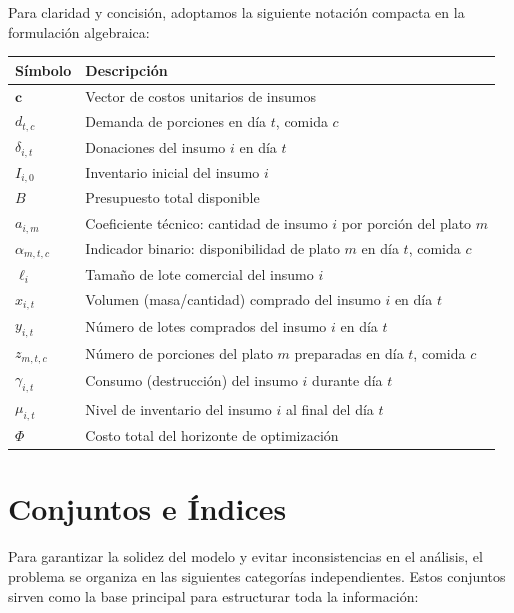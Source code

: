 \documentclass[12pt]{report}
\begin{document}
Para claridad y concisión, adoptamos la siguiente notación compacta en la formulación algebraica:

\begin{table}[h]
\centering
\small
\begin{tabular}{ll}
\toprule
\textbf{Símbolo} & \textbf{Descripción} \\
\midrule
$\mathbf{c}$ & Vector de costos unitarios de insumos \\
$d_{t,c}$ & Demanda de porciones en día $t$, comida $c$ \\
$\delta_{i,t}$ & Donaciones del insumo $i$ en día $t$ \\
$I_{i,0}$ & Inventario inicial del insumo $i$ \\
$B$ & Presupuesto total disponible \\
$a_{i,m}$ & Coeficiente técnico: cantidad de insumo $i$ por porción del plato $m$ \\
$\alpha_{m,t,c}$ & Indicador binario: disponibilidad de plato $m$ en día $t$, comida $c$ \\
$\ell_i$ & Tamaño de lote comercial del insumo $i$ \\
\midrule
$x_{i,t}$ & Volumen (masa/cantidad) comprado del insumo $i$ en día $t$ \\
$y_{i,t}$ & Número de lotes comprados del insumo $i$ en día $t$ \\
$z_{m,t,c}$ & Número de porciones del plato $m$ preparadas en día $t$, comida $c$ \\
$\gamma_{i,t}$ & Consumo (destrucción) del insumo $i$ durante día $t$ \\
$\mu_{i,t}$ & Nivel de inventario del insumo $i$ al final del día $t$ \\
$\Phi$ & Costo total del horizonte de optimización \\
\bottomrule
\end{tabular}
\end{table}

\section{Conjuntos e Índices}
Para garantizar la solidez del modelo y evitar inconsistencias en el análisis, el problema se organiza en las siguientes categorías independientes. Estos conjuntos sirven como la base principal para estructurar toda la información:
\end{document}
